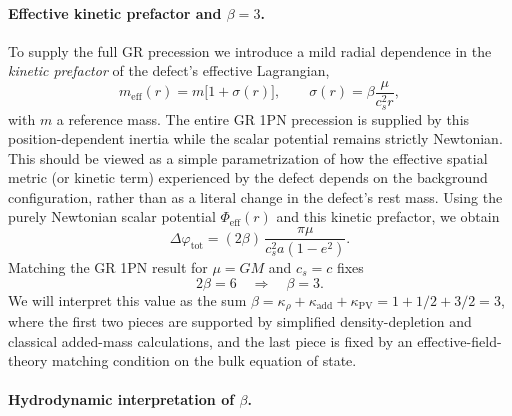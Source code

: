 \documentclass[11pt]{article}
\newcommand{\cS}{c_s}
\begin{document}
\paragraph{Effective kinetic prefactor and \texorpdfstring{$\beta = 3$}{beta = 3}.}

To supply the full GR precession we introduce a mild radial dependence
in the \emph{kinetic prefactor} of the defect’s effective Lagrangian,
\begin{equation}
  m_{\mathrm{eff}}(r) = m\bigl[ 1 + \sigma(r) \bigr],
  \qquad
  \sigma(r) = \beta \frac{\mu}{\cS^2 r},
\end{equation}
with $m$ a reference mass. The entire GR 1PN precession is supplied by this position-dependent inertia while the scalar potential remains strictly Newtonian.
This should be viewed as a simple parametrization of how the effective spatial metric (or kinetic
term) experienced by the defect depends on the background configuration, rather than as a literal
change in the defect’s rest mass.
Using the purely Newtonian scalar potential $\Phi_{\mathrm{eff}}(r)$ and this kinetic prefactor, we obtain
\begin{equation}
  \Delta\varphi_{\mathrm{tot}} = (2\beta)\,\frac{\pi \mu}{\cS^2 a (1-e^2)}.
\end{equation}
Matching the GR 1PN result for $\mu = GM$ and $\cS = c$ fixes
\begin{equation}
  2\beta = 6
  \quad \Rightarrow \quad
  \beta = 3.
\end{equation}
We will interpret this value as the sum $\beta = \kappa_\rho + \kappa_{\mathrm{add}} + \kappa_{\mathrm{PV}} = 1 + 1/2 + 3/2 = 3$, where the first two pieces are supported by simplified density-depletion and classical added-mass calculations, and the last piece is fixed by an effective-field-theory matching condition on the bulk equation of state.

\paragraph{Hydrodynamic interpretation of \texorpdfstring{$\beta$}{beta}.}
\end{document}
